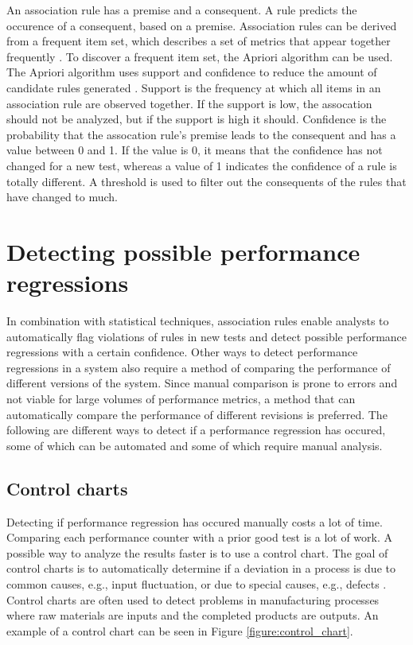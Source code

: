 An association rule has a premise and a consequent. A rule predicts the occurence of a consequent, based on a premise. Association rules can be derived from a frequent item set, which describes a set of metrics that appear together frequently . To discover a frequent item set, the Apriori algorithm can be used. The Apriori algorithm uses support and confidence to reduce the amount of candidate rules generated \cite{foo2010mining}.
Support is the frequency at which all items in an association rule are observed together. If the support is low, the assocation should not be analyzed, but if the support is high it should. Confidence is the probability that the assocation rule's premise leads to the consequent and has a value between 0 and 1. If the value is 0, it means that the confidence has not changed for a new test, whereas a value of 1 indicates the confidence of a rule is totally different. A threshold is used to filter out the consequents of the rules that have changed to much.

\section{Detecting possible performance regressions}
In combination with statistical techniques, association rules enable analysts to automatically flag violations of rules in new tests and detect possible performance regressions with a certain confidence. Other ways to detect performance regressions in a system also require a method of comparing the performance of different versions of the system. Since manual comparison is prone to errors and not viable for large volumes of performance metrics, a method that can automatically compare the performance of different revisions is preferred. The following are different ways to detect if a performance regression has occured, some of which can be automated and some of which require manual analysis.

\subsection{Control charts}
Detecting if performance regression has occured manually costs a lot of time. Comparing each performance counter with a prior good test is a lot of work. A possible way to analyze the results faster is to use a control chart. The goal of control charts is to automatically determine if a deviation in a process is due to common causes, e.g., input fluctuation, or due to special causes, e.g., defects \cite{nguyen2012using}. Control charts are often used to detect problems in manufacturing processes where raw materials are inputs and the completed products are outputs. An example of a control chart can be seen in Figure \ref{figure:control_chart}.

